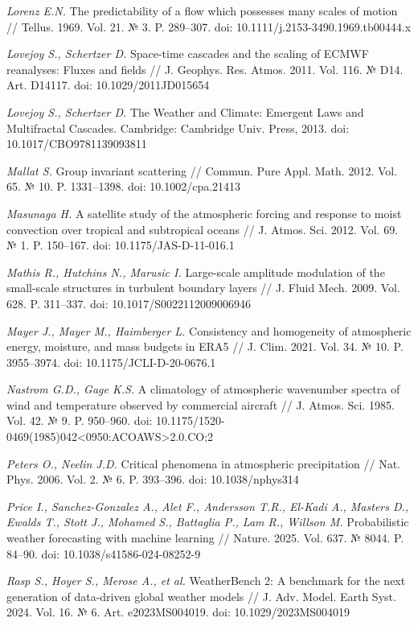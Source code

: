 \documentclass[12pt,a4paper]{article}
\begin{document}
\noindent \textit{Lorenz E.N.} The predictability of a flow which possesses many scales of motion // Tellus. 1969. Vol. 21. № 3. P. 289–307. doi: 10.1111/j.2153-3490.1969.tb00444.x

\noindent \textit{Lovejoy S., Schertzer D.} Space-time cascades and the scaling of ECMWF reanalyses: Fluxes and fields // J. Geophys. Res. Atmos. 2011. Vol. 116. № D14. Art. D14117. doi: 10.1029/2011JD015654

\noindent \textit{Lovejoy S., Schertzer D.} The Weather and Climate: Emergent Laws and Multifractal Cascades. Cambridge: Cambridge Univ. Press, 2013. doi: 10.1017/CBO9781139093811

\noindent \textit{Mallat S.} Group invariant scattering // Commun. Pure Appl. Math. 2012. Vol. 65. № 10. P. 1331–1398. doi: 10.1002/cpa.21413

\noindent \textit{Masunaga H.} A satellite study of the atmospheric forcing and response to moist convection over tropical and subtropical oceans // J. Atmos. Sci. 2012. Vol. 69. № 1. P. 150–167. doi: 10.1175/JAS-D-11-016.1

\noindent \textit{Mathis R., Hutchins N., Marusic I.} Large-scale amplitude modulation of the small-scale structures in turbulent boundary layers // J. Fluid Mech. 2009. Vol. 628. P. 311–337. doi: 10.1017/S0022112009006946

\noindent \textit{Mayer J., Mayer M., Haimberger L.} Consistency and homogeneity of atmospheric energy, moisture, and mass budgets in ERA5 // J. Clim. 2021. Vol. 34. № 10. P. 3955–3974. doi: 10.1175/JCLI-D-20-0676.1

\noindent \textit{Nastrom G.D., Gage K.S.} A climatology of atmospheric wavenumber spectra of wind and temperature observed by commercial aircraft // J. Atmos. Sci. 1985. Vol. 42. № 9. P. 950–960. doi: 10.1175/1520-0469(1985)042<0950:ACOAWS>2.0.CO;2

\noindent \textit{Peters O., Neelin J.D.} Critical phenomena in atmospheric precipitation // Nat. Phys. 2006. Vol. 2. № 6. P. 393–396. doi: 10.1038/nphys314

\noindent \textit{Price I., Sanchez-Gonzalez A., Alet F., Andersson T.R., El-Kadi A., Masters D., Ewalds T., Stott J., Mohamed S., Battaglia P., Lam R., Willson M.} Probabilistic weather forecasting with machine learning // Nature. 2025. Vol. 637. № 8044. P. 84–90. doi: 10.1038/s41586-024-08252-9

\noindent \textit{Rasp S., Hoyer S., Merose A., et al.} WeatherBench 2: A benchmark for the next generation of data-driven global weather models // J. Adv. Model. Earth Syst. 2024. Vol. 16. № 6. Art. e2023MS004019. doi: 10.1029/2023MS004019
\end{document}
